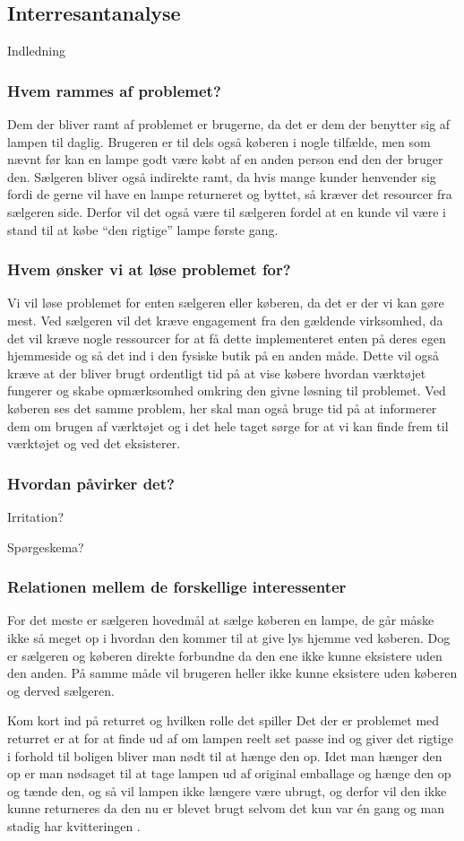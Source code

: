 \subsection{Interresantanalyse}
Indledning
\subsubsection{Hvem rammes af problemet?}
Dem der bliver ramt af problemet er brugerne, da det er dem der benytter sig af lampen til daglig. Brugeren er til dels også køberen i nogle tilfælde, men som nævnt før kan en lampe godt være købt af en anden person end den der bruger den.
Sælgeren bliver også indirekte ramt, da hvis mange kunder henvender sig fordi de gerne vil have en lampe returneret og byttet, så kræver det resourcer fra sælgeren side. Derfor vil det også være til sælgeren fordel at en kunde vil være i stand til at købe “den rigtige” lampe første gang.
 
\subsubsection{Hvem ønsker vi at løse problemet for?}
Vi vil løse problemet for enten sælgeren eller køberen, da det er der vi kan gøre mest. Ved sælgeren vil det kræve engagement fra den gældende virksomhed, da det vil kræve nogle ressourcer for at få dette implementeret enten på deres egen hjemmeside og så det ind i den fysiske butik på en anden måde. Dette vil også kræve at der bliver brugt ordentligt tid på at vise købere hvordan værktøjet fungerer og skabe opmærksomhed omkring den givne løsning til problemet.
Ved køberen ses det samme problem, her skal man også bruge tid på at informerer dem om brugen af værktøjet og i det hele taget sørge for at vi kan finde frem til værktøjet og ved det eksisterer.
 
\subsubsection{Hvordan påvirker det?}

Irritation?
 
Spørgeskema?
 
\subsubsection{Relationen mellem de forskellige interessenter}
For det meste er sælgeren hovedmål at sælge køberen en lampe, de går måske ikke så meget op i hvordan den kommer til at give lys hjemme ved køberen. Dog er sælgeren og køberen direkte forbundne da den ene ikke kunne eksistere uden den anden.  På samme måde vil brugeren heller ikke kunne eksistere uden køberen og derved sælgeren.
 
Kom kort ind på returret og hvilken rolle det spiller
Det der er problemet med returret er at for at finde ud af om lampen reelt set passe ind og giver det rigtige i forhold til boligen bliver man nødt til at hænge den op. Idet man hænger den op er man nødsaget til at tage lampen ud af original emballage og hænge den op og tænde den, og så vil lampen ikke længere være ubrugt, og derfor vil den ikke kunne returneres da den nu er blevet brugt selvom det kun var én gang og man stadig har kvitteringen \cite{ikea_returret}.
